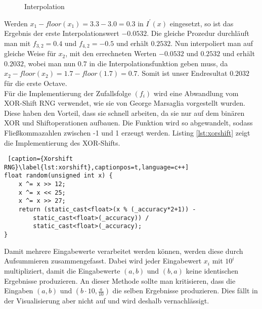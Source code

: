 \documentclass[11pt,a4paper]{article}
\begin{document}
\begin{center}
\begin{figure}[!ht]
\centering
{}
\caption[Interpolation]{Interpolation}
\label{fig:iprime}
\end{figure}
\end{center}
Werden $x_1 - floor(x_1) = 3.3 - 3.0 = 0.3$ in $I^\prime(x)$ eingesetzt, so ist das Ergebnis der erste Interpolationswert $-0.0532$. Die gleiche Prozedur durchläuft man mit $f_{3, 2} = 0.4$ und $f_{4, 2} = -0.5$ und erhält $0.2532$. Nun interpoliert man auf gleiche Weise für $x_2$, mit den errechneten Werten $-0.0532$ und $0.2532$ und erhält $0.2032$, wobei man nun $0.7$ in die Interpolationsfunktion geben muss, da $x_2 - floor(x_2) = 1.7 - floor(1.7) = 0.7$. Somit ist unser Endresultat $0.2032$ für die erste Octave.\\
Für die Implementierung der Zufallsfolge $(f_i)$ wird eine Abwandlung vom XOR-Shift RNG verwendet, wie sie von George Marsaglia \cite{ac8e278bab88e59aa3a147bef7b113350a723aa4547b89da74bdcadaf0244f1b} vorgestellt wurden. Diese haben den Vorteil, dass sie schnell arbeiten, da sie nur auf dem binären XOR und Shiftoperationen aufbauen. Die Funktion wird so abgewandelt, sodass Fließkommazahlen zwischen -1 und 1 erzeugt werden. Listing \ref{lst:xorshift} zeigt die Implementierung des XOR-Shifts.

\begin{lstlisting} [caption={Xorshift RNG}\label{lst:xorshift},captionpos=t,language=c++]
float random(unsigned int x) {
	x ^= x >> 12;
	x ^= x << 25;
	x ^= x >> 27;
	return (static_cast<float>(x % (_accuracy*2+1)) -
		static_cast<float>(_accuracy)) /
		static_cast<float>(_accuracy);
}
\end{lstlisting}
\noindent
Damit mehrere Eingabewerte verarbeitet werden können, werden diese durch Aufsummieren zusammengefasst. Dabei wird jeder Eingabewert $x_i$ mit $10^i$ multipliziert, damit die Eingabewerte $(a, b)$ und $(b, a)$ keine identischen Ergebnisse produzieren. An dieser Methode sollte man kritisieren, dass die Eingaben $(a, b)$ und $(b\cdot 10, \frac{a}{10})$ die selben Ergebnisse produzieren. Dies fällt in der Visualisierung aber nicht auf und wird deshalb vernachlässigt.
\end{document}
